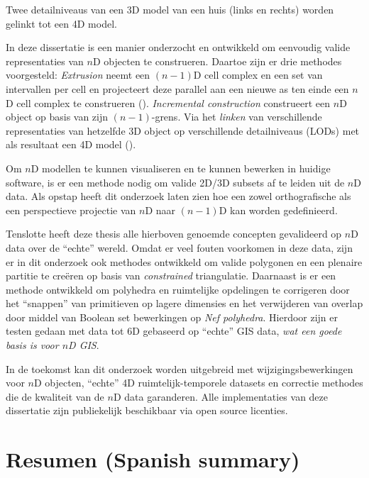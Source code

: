 {{\caption[Twee detailniveaus van een 3D model worden gelinkt tot een 4D model.]{Twee detailniveaus van een 3D model van een huis (links en rechts) worden gelinkt tot een 4D model.}
\label{fig:link-sum-nl}
}
In deze dissertatie is een manier onderzocht en ontwikkeld om eenvoudig valide representaties van $n$D objecten te construeren.
Daartoe zijn er drie methodes voorgesteld:
\emph{Extrusion} neemt een $(n-1)$D cell complex en een set van intervallen per cell en projecteert deze parallel aan een nieuwe as ten einde een $n$D cell complex te construeren (). 
\emph{Incremental construction} construeert een $n$D object op basis van zijn $(n-1)$-grens.
Via het \emph{linken} van verschillende representaties van hetzelfde 3D object op verschillende detailniveaus (LODs) met als resultaat een 4D model ().

Om $n$D modellen te kunnen visualiseren en te kunnen bewerken in huidige software, is er een methode nodig om valide 2D/3D subsets af te leiden uit de $n$D data.
Als opstap heeft dit onderzoek laten zien hoe een zowel orthografische als een perspectieve projectie van $n$D naar $(n-1)$D kan worden gedefinieerd.

Tenslotte heeft deze thesis alle hierboven genoemde concepten gevalideerd op $n$D data over de ``echte'' wereld.
Omdat er veel fouten voorkomen in deze data, zijn er in dit onderzoek ook methodes ontwikkeld om valide polygonen en een plenaire partitie te creëren op basis van \emph{constrained} triangulatie.
Daarnaast is er een methode ontwikkeld om polyhedra en ruimtelijke opdelingen te corrigeren door het ``snappen'' van primitieven op lagere dimensies en het verwijderen van overlap door middel van Boolean set bewerkingen op \emph{Nef polyhedra}.
Hierdoor zijn er testen gedaan met data tot 6D gebaseerd op ``echte'' GIS data, \emph{wat een goede basis is voor $n$D GIS}.\@

In de toekomst kan dit onderzoek worden uitgebreid met wijzigingsbewerkingen voor $n$D objecten, ``echte'' 4D ruimtelijk-temporele datasets en correctie methodes die de kwaliteit van de $n$D data garanderen.
Alle implementaties van deze dissertatie zijn publiekelijk beschikbaar via open source licenties.

}

\chapter{Resumen (Spanish summary)}

